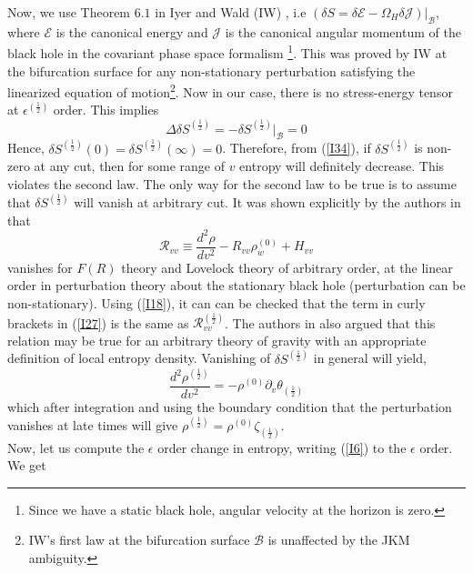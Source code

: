 \documentclass[12pt]{article}
\begin{document}
Now, we use Theorem $6.1$ in Iyer and Wald (IW) \cite{VR}, i.e  $(\delta S= \delta \mathcal{E}- \Omega_{H} \delta \mathcal{J})\Big|_{\mathcal{B}}$, where $\mathcal{E}$ is the canonical energy and $\mathcal{J}$ is the canonical angular momentum of the black hole in the covariant phase space formalism \footnote{Since we have a static black hole, angular velocity at the horizon is zero.}. This was proved by IW at the bifurcation surface for any non-stationary perturbation satisfying the linearized equation of motion\footnote{IW's first law at the bifurcation surface $\mathcal{B}$ is unaffected by the JKM ambiguity.}. Now in our case, there is no stress-energy tensor at $\epsilon^{(\frac{1}{2})}$ order. This implies
\begin{equation}\label{I34}
\Delta \delta S^{(\frac{1}{2})}=-\delta S^{(\frac{1}{2})}\Big|_{\mathcal{B}}=0
\end{equation}
Hence, $\delta S^{(\frac{1}{2})}(0)= \delta S^{(\frac{1}{2})}(\infty)=0$. Therefore, from (\ref{I34}), if $\delta S^{(\frac{1}{2})}$ is non-zero at any cut, then for some range of $v$ entropy will definitely decrease. This violates the second law. The only way for the second law to be true is to assume that $\delta S^{(\frac{1}{2})}$ will vanish at arbitrary cut. It was shown explicitly by the authors in \cite{AS,ASAS} that
\begin{equation}\label{I35}
\mathcal{R}_{vv}\equiv \frac{d^2\rho}{dv^2}- R_{vv} \rho_{w}^{(0)} + H_{vv}
\end{equation}
 vanishes for $F(R)$ theory and Lovelock theory of arbitrary order, at the linear order in perturbation theory about the stationary black hole (perturbation can be non-stationary). Using (\ref{I18}), it can  can be checked that the term in curly brackets in (\ref{I27}) is the same as $\mathcal{R}_{vv}^{(\frac{1}{2})}$. The authors in \cite{AS, ASAS} also argued that this relation may be true for an arbitrary theory of gravity with an appropriate definition of local entropy density. Vanishing of $\delta S^{(\frac{1}{2})}$ in general will yield,
 \begin{equation}\label{I36}
 \frac{d^2\rho^{(\frac{1}{2})}}{dv^2}= - \rho^{(0)} \partial_v \theta_{(\frac{1}{2})}
\end{equation}
which after integration and using the boundary condition that the perturbation vanishes at late times will give  $\rho^{(\frac{1}{2})}=\rho^{(0)} \zeta_{(\frac{1}{2})} $.
\\
 Now, let us compute the $\epsilon$ order change in entropy, writing (\ref{I6}) to the $\epsilon$ order. We get
\end{document}
